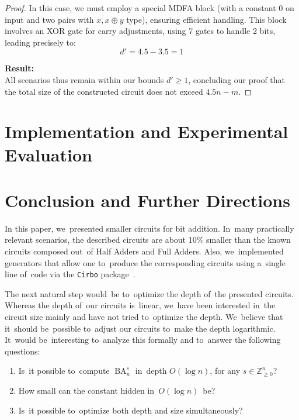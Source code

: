 \documentclass[sigconf, review, anonymous]{acmart}
\DeclareMathOperator{\BA}{BA}
\begin{document}
\begin{proof}
In this case, we must employ a special MDFA block (with a constant 0 on input and two pairs with  \(x, x \oplus y \) type), ensuring efficient handling. This block involves an XOR gate for carry adjustments, using 7 gates to handle 2 bits, leading precisely to:
\[
d' = 4.5 - 3.5 = 1
\]


\textbf{Result:}\\
All scenarios thus remain within our bounds \(d' \ge 1\), concluding our proof that the total size of the constructed circuit does not exceed \(4.5n - m\).
\end{proof}

\section{Implementation and Experimental Evaluation}

\section{Conclusion and Further Directions}

In this paper, we~presented smaller circuits for bit addition.
In~many practically relevant scenarios, the described circuits
are about 10\% smaller than the known circuits composed
out~of Half Adders and Full Adders.
Also, we~implemented generators that allow one
to~produce the corresponding circuits using a~single line of~code
via the \texttt{Cirbo} package~\cite{DBLP:journals/corr/abs-2412-14933}.

The next natural step would~be to~optimize the depth of~the presented circuits.
Whereas the depth of~our circuits is~linear,
we~have been interested in~the circuit size mainly and
have not tried to~optimize the depth. We~believe that it~should be~possible
to~adjust our circuits to~make the depth logarithmic. It~would be~interesting
to~analyze this formally and to~answer the following questions:
\begin{enumerate}
	\item Is~it possible to~compute $\BA_n^s$ in~depth $O(\log n)$, for any $s \in \mathbb{Z}_{\ge 0}^n$?
	\item How small can the constant hidden in~$O(\log n)$~be?
	\item Is~it possible to~optimize both depth and size simultaneously?
\end{enumerate}





\end{document}
